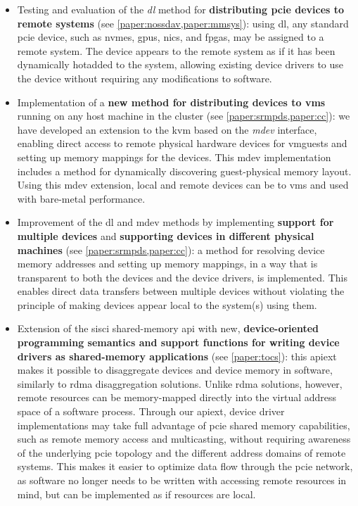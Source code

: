 \begin{itemize}
    \item Testing and evaluation of the \emph{\gls{dl}} method for \textbf{distributing \gls{pcie} devices to remote systems} (see \cref{paper:nossdav,paper:mmsys}): 
        using \gls{dl}, any standard \gls{pcie} device, such as \glspl{nvme}, \glspl{gpu}, \glspl{nic}, and \glspl{fpga}, may be assigned to a remote system. 
        The device appears to the remote system as if it has been dynamically \gls{hotadded} to the system, allowing existing device drivers to use the device without requiring any modifications to software.

    \item Implementation of a \textbf{new method for distributing devices to \glspl{vm}} running on any host machine in the cluster (see \cref{paper:srmpds,paper:cc}): 
        we have developed an extension to the \gls{kvm} based on the \emph{\gls{mdev}} interface, enabling direct access to remote physical hardware devices for \glspl{vmguest} and setting up memory mappings for the devices. 
        This \gls{mdev} implementation includes a method for dynamically discovering \gls{guest}-physical memory layout. Using this \gls{mdev} extension, local and remote devices can be  to \glspl{vm} and used with bare-metal performance.
	
    \item Improvement of the \gls{dl} and \gls{mdev} methods by implementing \textbf{support for multiple devices} and \textbf{supporting devices in different physical machines} (see \cref{paper:srmpds,paper:cc}):
        a method for resolving device memory addresses and setting up memory mappings, in a way that is transparent to both the devices and the device drivers, is implemented. 
        This enables direct data transfers between multiple devices without violating the principle of making devices appear local to the system(s) using them.

    \item Extension of the \gls{sisci} shared-memory \gls{api} with new, \textbf{device-oriented programming semantics and support functions for writing device drivers as shared-memory applications} (see \cref{paper:tocs}):
    this \gls{apiext} makes it possible to \gls{disaggregate} devices and device memory in software, similarly to \gls{rdma} \gls{disaggregation} solutions.
	Unlike \gls{rdma} solutions, however, remote resources can be memory-mapped directly into the virtual address space of a software process.
        Through our \gls{apiext}, device driver implementations may take full advantage of \gls{pcie} shared memory capabilities, such as remote memory access and \gls{multicasting}, without requiring awareness of the underlying \gls{pcie} topology and the different address domains of remote systems.
	This makes it easier to optimize data flow through the \gls{pcie} network, as software no longer needs to be written with accessing remote resources in mind, but can be implemented as if resources are local.


\end{itemize}
